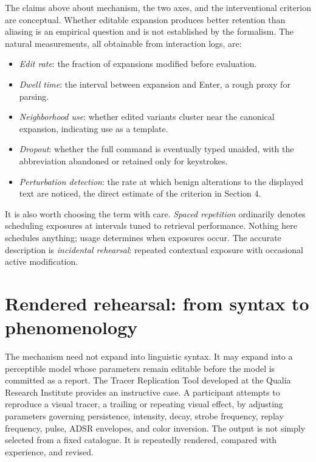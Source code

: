 \documentclass[11pt]{article}
\theoremstyle{remark}
\begin{document}
The claims above about mechanism, the two axes, and the interventional criterion are conceptual. Whether editable expansion produces better retention than aliasing is an empirical question and is not established by the formalism. The natural measurements, all obtainable from interaction logs, are:

\begin{itemize}
\item \emph{Edit rate}: the fraction of expansions modified before evaluation.
\item \emph{Dwell time}: the interval between expansion and Enter, a rough proxy for parsing.
\item \emph{Neighborhood use}: whether edited variants cluster near the canonical expansion, indicating use as a template.
\item \emph{Dropout}: whether the full command is eventually typed unaided, with the abbreviation abandoned or retained only for keystrokes.
\item \emph{Perturbation detection}: the rate at which benign alterations to the displayed text are noticed, the direct estimate of the criterion in Section 4.
\end{itemize}

It is also worth choosing the term with care. \emph{Spaced repetition} ordinarily denotes scheduling exposures at intervals tuned to retrieval performance. Nothing here schedules anything; usage determines when exposures occur. The accurate description is \emph{incidental rehearsal}: repeated contextual exposure with occasional active modification.

\section{Rendered rehearsal: from syntax to phenomenology}

The mechanism need not expand into linguistic syntax. It may expand into a perceptible model whose parameters remain editable before the model is committed as a report. The Tracer Replication Tool developed at the Qualia Research Institute \cite{qri} provides an instructive case. A participant attempts to reproduce a visual tracer, a trailing or repeating visual effect, by adjusting parameters governing persistence, intensity, decay, strobe frequency, replay frequency, pulse, ADSR envelopes, and color inversion. The output is not simply selected from a fixed catalogue. It is repeatedly rendered, compared with experience, and revised.
\end{document}
